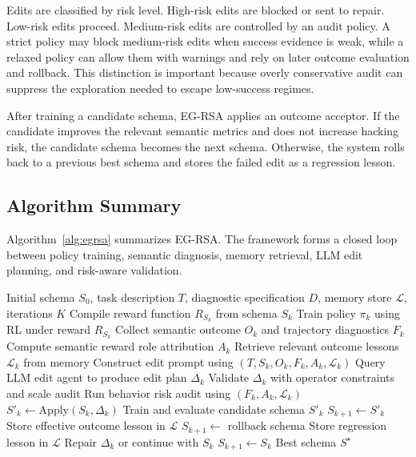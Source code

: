 \documentclass[11pt]{article}
\begin{document}
Edits are classified by risk level. High-risk edits are blocked or sent to repair. Low-risk edits proceed. Medium-risk edits are controlled by an audit policy. A strict policy may block medium-risk edits when success evidence is weak, while a relaxed policy can allow them with warnings and rely on later outcome evaluation and rollback. This distinction is important because overly conservative audit can suppress the exploration needed to escape low-success regimes.

After training a candidate schema, EG-RSA applies an outcome acceptor. If the candidate improves the relevant semantic metrics and does not increase hacking risk, the candidate schema becomes the next schema. Otherwise, the system rolls back to a previous best schema and stores the failed edit as a regression lesson.

\subsection{Algorithm Summary}

Algorithm~\ref{alg:egrsa} summarizes EG-RSA. The framework forms a closed loop between policy training, semantic diagnosis, memory retrieval, LLM edit planning, and risk-aware validation.

\begin{algorithm}[t]
\caption{EG-RSA Reward Schema Search}
\label{alg:egrsa}
\begin{algorithmic}[1]
\Require Initial schema $S_0$, task description $T$, diagnostic specification $D$, memory store $\mathcal{L}$, iterations $K$
    \State Compile reward function $R_{S_k}$ from schema $S_k$
    \State Train policy $\pi_k$ using RL under reward $R_{S_k}$
    \State Collect semantic outcome $O_k$ and trajectory diagnostics $F_k$
    \State Compute semantic reward role attribution $A_k$
    \State Retrieve relevant outcome lessons $\mathcal{L}_k$ from memory
    \State Construct edit prompt using $(T,S_k,O_k,F_k,A_k,\mathcal{L}_k)$
    \State Query LLM edit agent to produce edit plan $\Delta_k$
    \State Validate $\Delta_k$ with operator constraints and scale audit
    \State Run behavior risk audit using $(F_k,A_k,\mathcal{L}_k)$
        \State $S'_k \gets \mathrm{Apply}(S_k,\Delta_k)$
        \State Train and evaluate candidate schema $S'_k$
            \State $S_{k+1} \gets S'_k$
            \State Store effective outcome lesson in $\mathcal{L}$
        \Else
            \State $S_{k+1} \gets$ rollback schema
            \State Store regression lesson in $\mathcal{L}$
        \EndIf
    \Else
        \State Repair $\Delta_k$ or continue with $S_k$
        \State $S_{k+1} \gets S_k$
    \EndIf
\EndFor
\State \Return Best schema $S^\star$
\end{algorithmic}
\end{algorithm}
\end{document}
